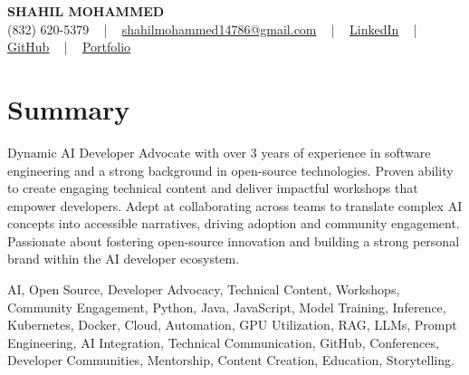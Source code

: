\documentclass[letterpaper,10pt]{article}
\begin{document}
\begin{center}
    {\fontsize{14pt}{12pt}\selectfont \textbf{\MakeUppercase{Shahil Mohammed}}}\\ \vspace{2pt}
    \fontsize{10pt}{12pt}\selectfont (832) 620-5379 ~ | ~ \href{mailto:shahilmohammed14786@gmail.com}{shahilmohammed14786@gmail.com} ~ | ~  
    \href{https://www.linkedin.com/in/shahil-mohammed-9652931a1/}{\color{blue}\underline{LinkedIn}}  ~ | ~ 
    \href{https://github.com/freakbeast14}{\color{blue}\underline{GitHub}} ~ | ~ 
    \href{https://shahil-mohammed.netlify.app/}{\color{blue}\underline{Portfolio}}
    \vspace{-8pt}
\end{center}

\section{Summary}
\vspace{-2pt}\fontsize{8pt}{9pt}\selectfont
Dynamic AI Developer Advocate with over 3 years of experience in software engineering and a strong background in open-source technologies. Proven ability to create engaging technical content and deliver impactful workshops that empower developers. Adept at collaborating across teams to translate complex AI concepts into accessible narratives, driving adoption and community engagement. Passionate about fostering open-source innovation and building a strong personal brand within the AI developer ecosystem.
 \vspace{-5pt}
 
{\fontsize{1pt}{1pt}\selectfont\color{white}
AI, Open Source, Developer Advocacy, Technical Content, Workshops, Community Engagement, Python, Java, JavaScript, Model Training, Inference, Kubernetes, Docker, Cloud, Automation, GPU Utilization, RAG, LLMs, Prompt Engineering, AI Integration, Technical Communication, GitHub, Conferences, Developer Communities, Mentorship, Content Creation, Education, Storytelling.
}
\vspace{-8pt}

\vspace{-2pt}
\end{document}
